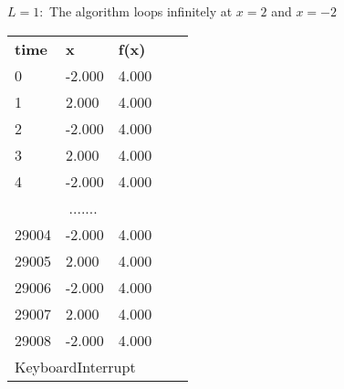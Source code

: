 \documentclass{article}
\begin{document}
        \textbf{$L = 1:$} The algorithm loops infinitely at $x=2$ and $x=-2$
    \begin{table}[]
        \begin{tabular}{|lll|ll}
        \cline{1-3}
        \multicolumn{1}{|l|}{\textbf{time}} & \multicolumn{1}{l|}{\textbf{x}} & \textbf{f(x)} &  &  \\ \cline{1-3}
        \multicolumn{1}{|l|}{0}             & \multicolumn{1}{l|}{-2.000}     & 4.000         &  &  \\ \cline{1-3}
        \multicolumn{1}{|l|}{1}             & \multicolumn{1}{l|}{2.000}      & 4.000         &  &  \\ \cline{1-3}
        \multicolumn{1}{|l|}{2}             & \multicolumn{1}{l|}{-2.000}     & 4.000         &  &  \\ \cline{1-3}
        \multicolumn{1}{|l|}{3}             & \multicolumn{1}{l|}{2.000}      & 4.000         &  &  \\ \cline{1-3}
        \multicolumn{1}{|l|}{4}             & \multicolumn{1}{l|}{-2.000}     & 4.000         &  &  \\ \cline{1-3}
        \multicolumn{3}{|c|}{.......}                                                         &  &  \\ \cline{1-3}
        \multicolumn{1}{|l|}{29004}         & \multicolumn{1}{l|}{-2.000}     & 4.000         &  &  \\ \cline{1-3}
        \multicolumn{1}{|l|}{29005}         & \multicolumn{1}{l|}{2.000}      & 4.000         &  &  \\ \cline{1-3}
        \multicolumn{1}{|l|}{29006}         & \multicolumn{1}{l|}{-2.000}     & 4.000         &  &  \\ \cline{1-3}
        \multicolumn{1}{|l|}{29007}         & \multicolumn{1}{l|}{2.000}      & 4.000         &  &  \\ \cline{1-3}
        \multicolumn{1}{|l|}{29008}         & \multicolumn{1}{l|}{-2.000}     & 4.000         &  &  \\ \cline{1-3}
        \multicolumn{3}{|l|}{KeyboardInterrupt}                                               &  &  \\ \cline{1-3}
        \end{tabular}
        \end{table}
    
\end{document}
